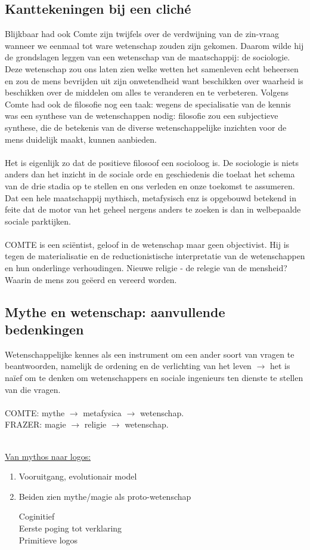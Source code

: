 \documentclass[11pt,a4paper]{article}
\begin{document}
\subsection{Kanttekeningen bij een clich\'e}
Blijkbaar had ook Comte zijn twijfels over de verdwijning van de zin-vraag wanneer we eenmaal tot ware wetenschap zouden zijn gekomen. Daarom wilde hij de grondslagen leggen van een wetenschap van de maatschappij: de sociologie. Deze wetenschap zou ons laten zien welke wetten het samenleven echt beheersen en zou de mens bevrijden uit zijn onwetendheid want beschikken over waarheid is beschikken over de middelen om alles te veranderen en te verbeteren.
Volgens Comte had ook de filosofie nog een taak: wegens de specialisatie van de kennis was een synthese van de wetenschappen nodig: filosofie zou een subjectieve synthese, die de betekenis van de diverse wetenschappelijke inzichten voor de mens duidelijk maakt, kunnen aanbieden.
\\
\\
Het is eigenlijk zo dat de positieve filosoof een socioloog is. De sociologie is niets anders dan het inzicht in de sociale orde en geschiedenis die toelaat het schema van de drie stadia op te stellen en ons verleden en onze toekomst te assumeren. Dat een hele maatschappij mythisch, metafysisch enz is opgebouwd betekend in feite dat de motor van het geheel nergens anders te zoeken is dan in welbepaalde sociale parktijken.
\\
\\
COMTE is een sci\"entist, geloof in de wetenschap maar geen objectivist. Hij is tegen de materialisatie en de reductionistische interpretatie van de wetenschappen en hun onderlinge verhoudingen. Nieuwe religie - de relegie van de mensheid? Waarin de mens zou ge\"eerd en vereerd worden.
\subsection{Mythe en wetenschap: aanvullende bedenkingen}
Wetenschappelijke kennes als een instrument om een ander soort van vragen te beantwoorden, namelijk de ordening en de verlichting van het leven $\rightarrow$ het is na\"ief om te denken om wetenschappers en sociale ingenieurs ten dienste te stellen van die vragen.
\\
\\
COMTE: mythe $\longrightarrow$ metafysica $\longrightarrow$ wetenschap.
\\
FRAZER: magie $\longrightarrow$ religie $\longrightarrow$ wetenschap.
\\
\\
\begin{center}
\underline{Van mythos naar logos:}
\end{center}
\begin{enumerate}
\item Vooruitgang, evolutionair model
\item Beiden zien mythe/magie als proto-wetenschap
\begin{flushleft}
Coginitief\\
Eerste poging tot verklaring\\
Primitieve logos
\end{flushleft}
\end{enumerate}
\end{document}

